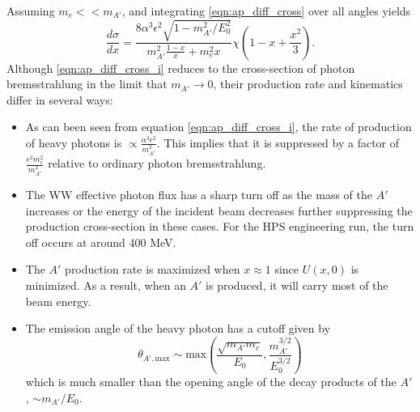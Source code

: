 Assuming $m_{e} << m_{A'}$, 
and integrating \ref{eqn:ap_diff_cross} over all angles yields
\begin{equation}
    \label{eqn:ap_diff_cross_i}
    \frac{d\sigma}{dx} = \frac{8\alpha^{3}\epsilon^{2} \sqrt{1-m_{A'}^{2}/E_{0}^{2}}}
    {m_{A'}^{2}\frac{1-x}{x} + m_{e}^{2}x}\chi
    \left( 1 - x + \frac{x^{2}}{3}\right).
\end{equation}
Although \ref{eqn:ap_diff_cross_i} reduces to the cross-section of photon 
bremsstrahlung in the limit that $m_{A'} \rightarrow 0$, their production rate
and kinematics differ in several ways: 
\begin{itemize}
    \item As can been seen from equation \ref{eqn:ap_diff_cross_i}, the rate of 
          production of heavy photons is $\propto \frac{\alpha^3 \epsilon^2}{m_{A'}^2}$.
          This implies that it is suppressed by a factor of 
          $\frac{\epsilon^{2}m_{e}^{2}}{m_{A'}^{2}}$ relative to ordinary photon 
          bremsstrahlung.
    \item The WW effective photon flux has a sharp turn off as the mass of the 
          $A'$ increases or the energy of the incident beam decreases further
          suppressing the production cross-section in these cases.  For the 
          HPS engineering run, the turn off occurs at around 400 MeV.
    \item The $A'$ production rate is maximized when $x \approx 1$ since 
          $U(x, 0)$  is minimized.  As a result, when an $A'$ is produced, 
          it will carry most of the beam energy.
      \item The emission angle of the heavy photon has a cutoff given by 
          \begin{equation}
              \theta_{A', \text{max}} \sim \text{max}\left(\frac{\sqrt{m_{A'}m_e}}{E_0}, 
              \frac{m_{A'}^{3/2}}{E_{0}^{3/2}}\right)
          \end{equation}
          which is much smaller than the opening angle of the decay products of
          the $A'$, $\sim m_{A'}/E_{0}$. 
\end{itemize}


